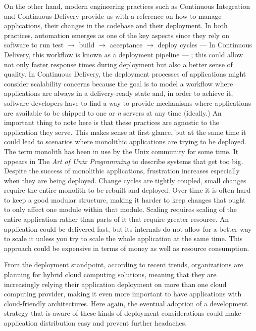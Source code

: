 \documentclass[10pt,article]{IEEEtran}
\begin{document}
On the other hand, modern engineering practices such as Continuous Integration and Continuous Delivery provide us with a reference on how to manage applications, their changes in the codebase and their deployment. In both practices, automation emerges as one of the key aspects since they rely on software to run test $\to$ build $\to$ acceptance $\to$ deploy cycles --- In Continuous Delivery, this workflow is known as a deployment pipeline --- ; this could allow not only faster response times during deployment but also a better sense of quality\cite{humble}. In Continuous Delivery, the deployment processes of applications might consider scalability concerns because the goal is to model a workflow where applications are always in a delivery-ready state and, in order to achieve it, software developers have to find a way to provide mechanisms where applications are available to be shipped to one or \textit{n} servers at any time (ideally.)
An important thing to note here is that these practices are agnostic to the application they serve. This makes sense at first glance, but at the same time it could lead to scenarios where monolithic  applications are trying to be deployed. The term monolith has been in use by the Unix community for some time. It appears in The \emph{Art of Unix Programming}\cite{artofunix} to describe systems that get too big. Despite the success of monolithic applications, frustration increases especially when they are being deployed. Change cycles are tightly coupled, small changes require the entire monolith to be rebuilt and deployed. Over time it is often hard to keep a good modular structure, making it harder to keep changes that ought to only affect one module within that module. Scaling requires scaling of the entire application rather than parts of it that require greater resource\cite{monolit:fowler}. An application could be delivered fast, but its internals do not allow for a better way to scale it unless you try to scale the whole application at the same time. This approach could be expensive in terms of money as well as resource consumption. 

From the deployment standpoint, according to recent trends, organizations are planning for hybrid cloud computing solutions, meaning that they are increasingly relying their application deployment on more than one cloud computing provider\cite{rightscale}, making it even more important to have applications with cloud-friendly architectures. Here again, the eventual adoption of a development strategy that is aware of these kinds of deployment considerations could make application distribution easy and prevent further headaches.
 
\end{document}
